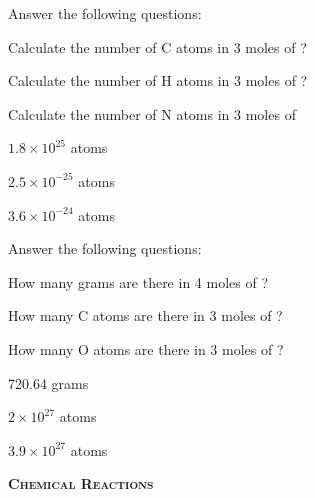 \documentclass[main.tex]{subfiles}
\begin{document}
\begin{multicols*}{2}
\begin{question}[ID=\the\value{numA}]
Answer the following questions:
\begin{inparaenum}[(a)]	
\item  Calculate the number of C atoms in 3 moles of ?	%
\item Calculate the number of H atoms in 3 moles of ?	%
\item Calculate the number of N atoms in 3 moles of 		%
\end{inparaenum} 
\end{question}
\begin{solution}
\begin{inparaenum}[(a)]	
 \item   $1.8\times 10^{25}$ atoms
\item  $2.5\times 10^{-25}$ atoms
\item  $3.6\times 10^{-24}$ atoms
\end{inparaenum} 
\hspace{0.1cm}\end{solution}%
\begin{question}[ID=\the\value{numA}]
Answer the following questions:
\begin{inparaenum}[(a)]	
\item How many grams are there in 4 moles of ?	%
\item How many C atoms are there in 3 moles of ?%
\item How many O atoms are there in 3 moles of ?%
\end{inparaenum} 
\end{question}
\begin{solution}
\begin{inparaenum}[(a)]	
 \item  720.64 grams
\item  $2\times 10^{27}$ atoms
\item  $3.9\times 10^{27}$ atoms
\end{inparaenum} 
\hspace{0.1cm}\end{solution}%

{\raggedright\textsc{\textbf{Chemical Reactions}}\par}


\end{multicols*}
\end{document}

